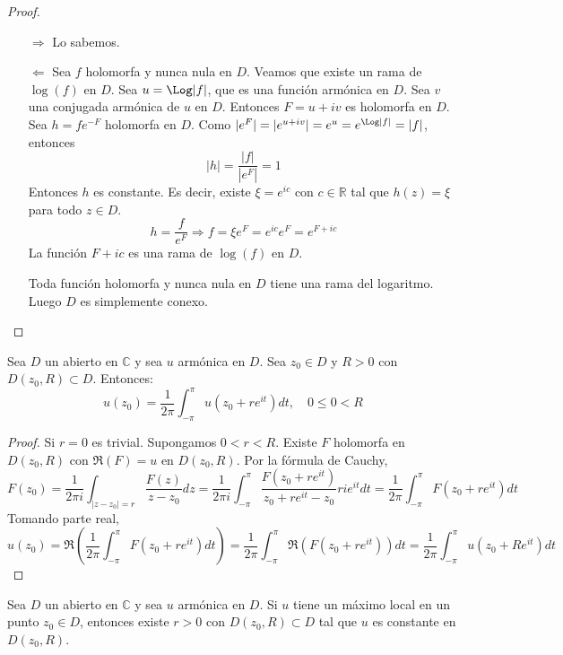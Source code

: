 \begin{proof}
    \hfill
    \begin{itemize}
        \item[$\Rightarrow$] Lo sabemos.
        \item[$\Leftarrow$] Sea $f$ holomorfa y nunca nula en $D$.
            Veamos que existe un rama de $\log(f)$ en $D$.
            Sea $u = \Log|f|$, que es una función armónica en $D$.
            Sea $v$ una conjugada armónica de $u$ en $D$.
            Entonces $F = u + iv$ es holomorfa en $D$.
            Sea $h = fe^{-F}$ holomorfa en $D$.
            Como $|e^F| = |e^{u+iv}| = e^u = e^{\Log|f|} = |f|$, entonces
            $$|h| = \frac{|f|}{|e^F|} = 1$$
            Entonces $h$ es constante.
            Es decir, existe $\xi = e^{ic}$ con $c \in \mathbb{R}$ tal que $h(z) = \xi$ para todo $z \in D$.
            $$h = \frac{f}{e^F} \Rightarrow f = \xi e^F = e^{ic}e^F = e^{F + ic}$$
            La función $F + ic$ es una rama de $\log(f)$ en $D$.

            Toda función holomorfa y nunca nula en $D$ tiene una rama del logaritmo.
            Luego $D$ es simplemente conexo.
    \end{itemize}
\end{proof}

\begin{theorem}
    Sea $D$ un abierto en $\mathbb{C}$ y sea $u$ armónica en $D$.
    Sea $z_0 \in D$ y $R > 0$ con $D(z_0, R) \subset D$.
    Entonces:
    $$u(z_0) = \frac{1}{2\pi} \int_{-\pi}^\pi u(z_0 + re^{it})dt, \quad 0 \leq 0 < R$$
\end{theorem}

\begin{proof}
    Si $r = 0$ es trivial.
    Supongamos $0 < r < R$.
    Existe $F$ holomorfa en $D(z_0, R)$ con $\Re(F) = u$ en $D(z_0, R)$.
    Por la fórmula de Cauchy,
    $$F(z_0) = \frac{1}{2\pi i} \int_{|z-z_0|=r} \frac{F(z)}{z-z_0}dz = \frac{1}{2\pi i} \int_{-\pi}^\pi \frac{F(z_0 + re^{it})}{z_0 + re^{it} - z_0}rie^{it}dt = \frac{1}{2\pi} \int_{-\pi}^\pi F(z_0 + re^{it})dt$$
    Tomando parte real,
    $$u(z_0) = \Re\left(\frac{1}{2\pi} \int_{-\pi}^\pi F(z_0 + re^{it})dt\right) = \frac{1}{2\pi} \int_{-\pi}^\pi \Re(F(z_0 + re^{it}))dt = \frac{1}{2\pi} \int_{-\pi}^\pi u(z_0 + Re^{it})dt$$
\end{proof}

\begin{theorem}
    Sea $D$ un abierto en $\mathbb{C}$ y sea $u$ armónica en $D$.
    Si $u$ tiene un máximo local en un punto $z_0 \in D$, entonces existe $r > 0$ con $D(z_0, R) \subset D$ tal que $u$ es constante en $D(z_0, R)$.
\end{theorem}

